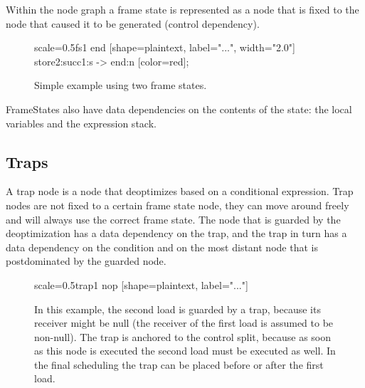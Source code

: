 \documentclass[twocolumn]{svjour3}
\begin{document}
Within the node graph a frame state is represented as a node that is fixed to the node that caused it to be generated (control dependency).


\begin{figure}[h]
  \label{fig:fs1}
  \centering
\begin{digraphenv}{scale=0.5}{fs1}
    end [shape=plaintext, label="...", width="2.0"]
    store2:succ1:s -> end:n [color=red];
\end{digraphenv}
  \caption{Simple example using two frame states.}
\end{figure}

FrameStates also have data dependencies on the contents of the state: the local variables and the expression stack.

\subsection{Traps}
A trap node is a node that deoptimizes based on a conditional expression.
Trap nodes are not fixed to a certain frame state node, they can move around freely and will always use the correct frame state.
The node that is guarded by the deoptimization has a data dependency on the trap, and the trap in turn has a data dependency on the condition and on the most distant node that is postdominated by the guarded node.

\begin{figure}[h]
  \label{fig:trap1}
  \centering
\begin{digraphenv}{scale=0.5}{trap1}
    nop [shape=plaintext, label="..."]
\end{digraphenv}
  \caption{In this example, the second load is guarded by a trap, because its receiver might be null (the receiver of the first load is assumed to be non-null).
The trap is anchored to the control split, because as soon as this node is executed the second load must be executed as well.
In the final scheduling the trap can be placed before or after the first load.}
\end{figure}
\end{document}
